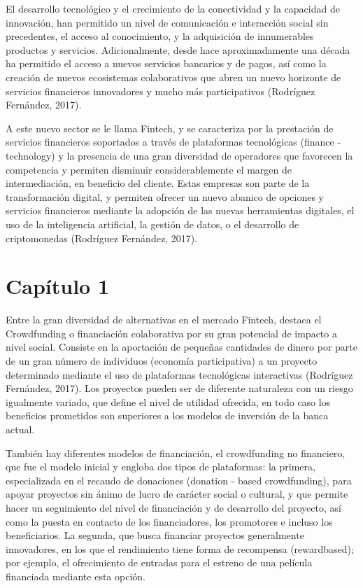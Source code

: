 \documentclass[
]{book}
\begin{document}
El desarrollo tecnológico y el crecimiento de la conectividad y la capacidad de innovación, han permitido un nivel de comunicación e interacción social sin precedentes, el acceso al conocimiento, y la adquisición de innumerables productos y servicios. Adicionalmente, desde hace aproximadamente una década ha permitido el acceso a nuevos servicios bancarios y de pagos, así como la creación de nuevos ecosistemas colaborativos que abren un nuevo horizonte de servicios financieros innovadores y mucho más participativos (Rodríguez Fernández, 2017).

A este nuevo sector se le llama Fintech, y se caracteriza por la prestación de servicios financieros soportados a través de plataformas tecnológicas (finance - technology) y la presencia de una gran diversidad de operadores que favorecen la competencia y permiten disminuir considerablemente el margen de intermediación, en beneficio del cliente. Estas empresas son parte de la transformación digital, y permiten ofrecer un nuevo abanico de opciones y servicios financieros mediante la adopción de las nuevas herramientas digitales, el uso de la inteligencia artificial, la gestión de datos, o el desarrollo de criptomonedas (Rodríguez Fernández, 2017).

\hypertarget{capuxedtulo-1}{%
\chapter{Capítulo 1}\label{capuxedtulo-1}}

Entre la gran diversidad de alternativas en el mercado Fintech, destaca el Crowdfunding o financiación colaborativa por su gran potencial de impacto a nivel social. Consiste en la aportación de pequeñas cantidades de dinero por parte de un gran número de individuos (economía participativa) a un proyecto determinado mediante el uso de plataformas tecnológicas interactivas (Rodríguez Fernández, 2017). Los proyectos pueden ser de diferente naturaleza con un riesgo igualmente variado, que define el nivel de utilidad ofrecida, en todo caso los beneficios prometidos son superiores a los modelos de inversión de la banca actual.

También hay diferentes modelos de financiación, el crowdfunding no financiero, que fue el modelo inicial y engloba dos tipos de plataformas: la primera, especializada en el recaudo de donaciones (donation - based crowdfunding), para apoyar proyectos sin ánimo de lucro de carácter social o cultural, y que permite hacer un seguimiento del nivel de financiación y de desarrollo del proyecto, así como la puesta en contacto de los financiadores, los promotores e incluso los beneficiarios. La segunda, que busca financiar proyectos generalmente innovadores, en los que el rendimiento tiene forma de recompensa (rewardbased); por ejemplo, el ofrecimiento de entradas para el estreno de una película financiada mediante esta opción.
\end{document}
